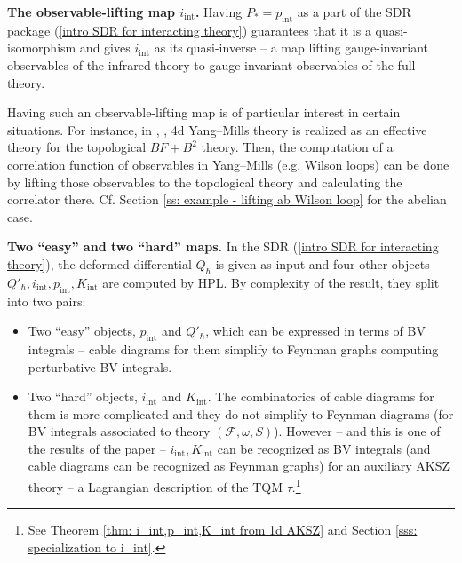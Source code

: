 \documentclass{amsart}
\theoremstyle{plain} %
\theoremstyle{definition}
\theoremstyle{remark}
\newcommand{\F}{\mathcal{F}}
\newcommand{\ii}{\mathrm{int}}
\newcommand{\iii}{\mathrm{i}}
\begin{document}

\textbf{The observable-lifting map $i_\ii$.}
Having $P_*=p_\ii$ as a part of the SDR package (\ref{intro SDR for interacting theory}) guarantees that it is a quasi-isomorphism and gives $i_\ii$ as its quasi-inverse -- a map lifting gauge-invariant observables of the infrared theory to gauge-invariant observables of the full theory.

Having such an observable-lifting map is of particular interest in certain situations. For instance, in \cite[Section 7.1]{C_surface_obs}, \cite[Section 5.2]{BCZ}, 4d Yang--Mills theory is realized as an effective theory for the topological $BF+B^2$ theory. Then, the computation of a correlation function of observables in Yang--Mills (e.g. Wilson loops) can be done by lifting those observables to the topological theory and calculating the correlator there. Cf. Section \ref{ss: example - lifting ab Wilson loop} for the abelian case.

\textbf{Two ``easy'' and two ``hard'' maps.}
In the SDR (\ref{intro SDR for interacting theory}), the deformed differential $Q_\hbar$ is given as input and four other objects $Q'_\hbar,i_\ii,p_\ii,K_\ii$ are computed by HPL. By complexity of the result, they split into two pairs:
\begin{itemize}
    \item Two ``easy'' objects, $p_\ii$ and $Q'_\hbar$, which can be expressed in terms of BV integrals -- cable diagrams for them simplify to Feynman graphs computing perturbative BV integrals.
    \item Two ``hard'' objects, $i_\ii$ and $K_\ii$. The combinatorics of cable diagrams for them is more complicated and they do not simplify to Feynman diagrams (for BV integrals associated to theory $(\F,\omega,S)$).
However -- and this is one of the results of the paper -- $i_\ii,K_\ii$ can be recognized as BV integrals (and cable  diagrams can be recognized as Feynman graphs) for an auxiliary AKSZ theory -- a Lagrangian description of the TQM $\tau$.\footnote{
See Theorem \ref{thm: i_int,p_int,K_int from 1d AKSZ} and Section \ref{sss: specialization to i_int}.
}
\end{itemize}
\end{document}
